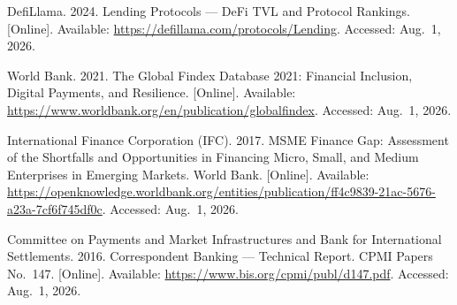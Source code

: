 {\begin{enumerate}[label={[\arabic*]}]
\item DefiLlama. 2024. Lending Protocols --- DeFi TVL and Protocol Rankings. [Online]. Available: \url{https://defillama.com/protocols/Lending}. Accessed: Aug.~1, 2026.

\item World Bank. 2021. The Global Findex Database 2021: Financial Inclusion, Digital Payments, and Resilience. [Online]. Available: \url{https://www.worldbank.org/en/publication/globalfindex}. Accessed: Aug.~1, 2026.




\item International Finance Corporation (IFC). 2017. MSME Finance Gap: Assessment of the Shortfalls and Opportunities in Financing Micro, Small, and Medium Enterprises in Emerging Markets. World Bank. [Online]. Available: \url{https://openknowledge.worldbank.org/entities/publication/ff4c9839-21ac-5676-a23a-7cf6f745df0c}. Accessed: Aug.~1, 2026.


\item Committee on Payments and Market Infrastructures and Bank for International Settlements. 2016. Correspondent Banking --- Technical Report. CPMI Papers No.~147. [Online]. Available: \url{https://www.bis.org/cpmi/publ/d147.pdf}. Accessed: Aug.~1, 2026.



\end{enumerate}}
